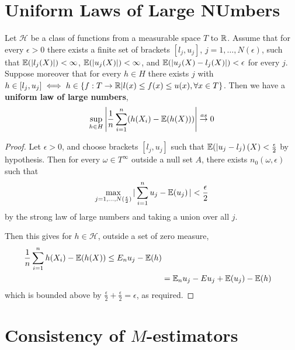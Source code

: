\section{Uniform Laws of Large NUmbers}
\label{sec:uniform-laws-large-1}

\begin{thm}
  Let $\mathcal{H}$ be a class of functions from a measurable space
  $T$ to $\mathbb{R}$. Assume that for every $\epsilon > 0$ there exists a
  finite set of brackets $[l_{j}, u_{j}]$, $j = 1, \dots,
  N(\epsilon)$, such that $\E{|l_{j}(X)|} < \infty$, $\E{|u_{j}(X)|} <
  \infty$, and $\E{|u_{j}(X) - l_{j}(X)|} < \epsilon$ for every $j$.
  Suppose moreover that for every $h \in H$ there exists $j$ with $h
  \in [l_{j}, u_{j}] \iff h \in \{ f: T \rightarrow \mathbb{R} | l(x) \leq
  f(x) \leq u(x), \forall x \in T \}$. Then we have a \textbf{uniform
    law of large numbers},
  \begin{equation}
    \label{eq:1}
    \sup_{h \in H} \left| \frac{1}{n} \sum_{i=1}^{n} (h(X_{i}) -
      \E{h(X)}) \right| \cas 0
  \end{equation}
\end{thm}

\begin{proof}
  Let $\epsilon > 0$, and choose brackets $[l_{j}, u_{j}]$ such that
  $\E{|u_{j} - l_{j}}(X) < \frac{\epsilon}{2}$ by hypothesis. Then for
  every $\omega \in T^{\infty}$ outside a null set $A$, there exists
  $n_{0}(\omega, \epsilon)$ such that
  \begin{align}
    \label{eq:41}
    \max_{j = 1, \dots, N(\frac{\epsilon}{2})} |\sum_{i=1}^{n} u_{j} -
    \E{u_{j}}| < \frac{\epsilon}{2}
  \end{align} by the strong law of large numbers and taking a union
  over all $j$.

  Then this gives for $h \in \mathcal{H}$, outside a set of zero
  measure,
  \begin{align}
    \label{eq:42}
    \frac{1}{n} \sum_{i=1}^{n} h(X_{i}) - \E{h(X)} \leq E_{n} u_{j} -  \E{h} \\
    &= \E_{n} u_{j}  - E{u_{j}} + \E{u_{j}} - \E{h}
  \end{align} which is bounded above by $\frac{\epsilon}{2} +
  \frac{\epsilon}{2} = \epsilon$, as required.
\end{proof}

\section{Consistency of $M$-estimators}
\label{sec:cons-m-estim-1}

